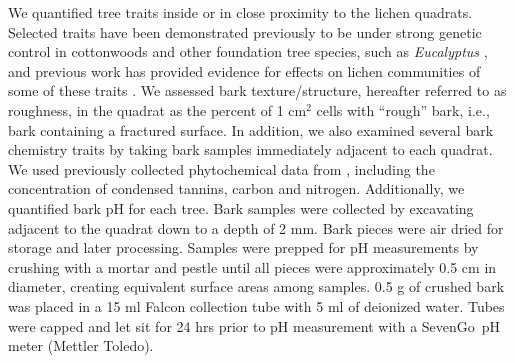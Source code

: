\documentclass[fleqn,12pt]{olplainarticle}
\begin{document}
We quantified tree traits inside or in close proximity to the lichen
quadrats. Selected traits have been demonstrated previously to be
under strong genetic control in cottonwoods \citep{Bdeir2017} and
other foundation tree species, such as \textit{Eucalyptus}
\citep{Nantongo2020}, and previous work has provided evidence for
effects on lichen communities of some of these traits
\citep{Lamit2011}. We assessed bark texture/structure, hereafter
referred to as roughness, in the quadrat as the percent of 1 cm$^2$
cells with ``rough'' bark, i.e., bark containing a fractured
surface. In addition, we also examined several bark chemistry traits
by taking bark samples immediately adjacent to each quadrat. We used
previously collected phytochemical data from \cite{Lamit2011},
including the concentration of condensed tannins, carbon and
nitrogen. Additionally, we quantified bark pH for each tree.  Bark
samples were collected by excavating adjacent to the quadrat down to a
depth of 2 mm. Bark pieces were air dried for storage and later
processing. Samples were prepped for pH measurements by crushing with
a mortar and pestle until all pieces were approximately 0.5 cm in
diameter, creating equivalent surface areas among samples. 0.5 g of
crushed bark was placed in a 15 ml Falcon collection tube with 5 ml of
deionized water. Tubes were capped and let sit for 24 hrs prior to pH
measurement with a SevenGo\texttrademark\ pH meter (Mettler Toledo).
\end{document}
